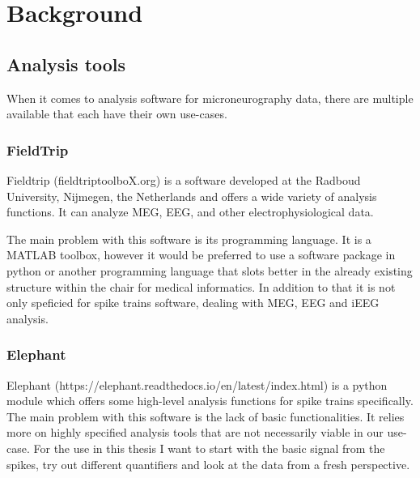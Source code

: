 \chapter{Background}


\section{Analysis tools}
When it comes to analysis software for microneurography data,  there are multiple available that each have their own use-cases.

\subsection{FieldTrip}
Fieldtrip (fieldtriptoolboX.org) is a software developed at the Radboud University,  Nijmegen,  the Netherlands and offers a wide variety of analysis functions.  It can analyze MEG, EEG, and other electrophysiological data.

The main problem with this software is its programming language. It is a MATLAB toolbox, however it would be preferred to use a software package in python or another programming language that slots better in the already existing structure within the chair for medical informatics. In addition to that it is not only speficied for spike trains software, dealing with MEG, EEG and iEEG analysis. 

\subsection{Elephant}
Elephant (https://elephant.readthedocs.io/en/latest/index.html) is a python module which offers some high-level analysis functions for spike trains specifically.  The main problem with this software is the lack of basic functionalities.  It relies more on highly specified analysis tools that are not necessarily viable in our use-case.  For the use in this thesis I want to start with the basic signal from the spikes, try out different quantifiers and look at the data from a fresh perspective. 


